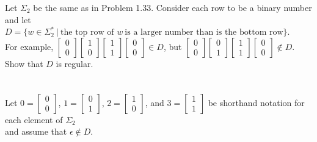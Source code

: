 \begin{enumerate}
          Let $\Sigma_2$ be the same as in Problem 1.33. Consider each row to be a binary number and let\\
          $D=\{ w \in \Sigma^\ast_2~ |~\text{the top row of }w~ \text{is a larger number than is the bottom row}\}$. \\
          For example, $\begin{bmatrix}0 \\0\end{bmatrix} \begin{bmatrix}1 \\0\end{bmatrix} \begin{bmatrix}1 \\1\end{bmatrix} \begin{bmatrix}0 \\0\end{bmatrix} \in D$, but $\begin{bmatrix}0\\ 0\end{bmatrix} \begin{bmatrix}0\\ 1\end{bmatrix} \begin{bmatrix} 1\\ 1\end{bmatrix} \begin{bmatrix} 0\\ 0\end{bmatrix} \notin D$. \\
          Show that $D$ is regular.
          \\
          \\
          \\
          Let $0 = \begin{bmatrix}0 \\ 0\end{bmatrix}$, $1 = \begin{bmatrix}0 \\ 1\end{bmatrix}$, $2 = \begin{bmatrix}1 \\ 0\end{bmatrix}$, and $3 = \begin{bmatrix}1 \\ 1\end{bmatrix}$ be shorthand notation for each element of $\Sigma_2$ \\
          and assume that $\epsilon \notin D$.


\end{enumerate}
